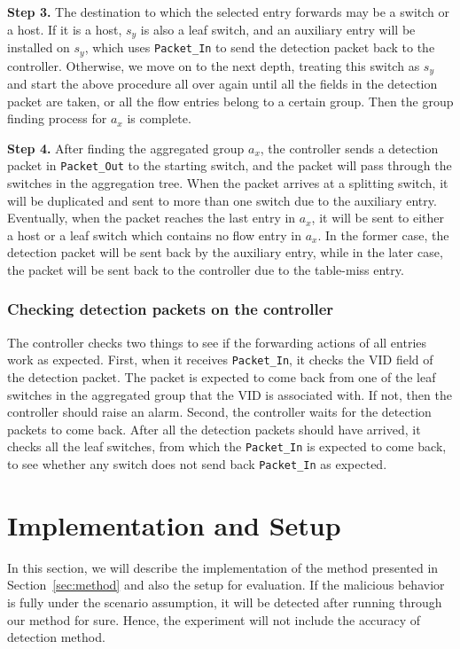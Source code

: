 \documentclass[conference]{IEEEtran}
\begin{document}
\textbf{Step 3.}
The destination to which the selected entry forwards may be a switch or a host. If it is a host, $s_y$ is also a leaf switch, and an auxiliary entry will be installed on $s_y$, which uses \texttt{Packet\_In} to send the detection packet back to the controller. Otherwise, we move on to the next depth, treating this switch as $s_y$ and start the above procedure all over again until all the fields in the detection packet are taken, or all the flow entries belong to a certain group. Then the group finding process for $a_x$ is complete.

\textbf{Step 4.}
After finding the aggregated group $a_x$, the controller sends a detection packet in \texttt{Packet\_Out} to the starting switch, and the packet will pass through the switches in the aggregation tree. When the packet arrives at a splitting switch, it will be duplicated and sent to more than one switch due to the auxiliary entry. Eventually, when the packet reaches the last entry in $a_x$, it will be sent to either a host or a leaf switch which contains no flow entry in $a_x$. In the former case, the detection packet will be sent back by the auxiliary entry, while in the later case, the packet will be sent back to the controller due to the table-miss entry.

\subsubsection{Checking detection packets on the controller}
The controller checks two things to see if the forwarding actions of all entries work as expected. First, when it receives \texttt{Packet\_In}, it checks the VID field of the detection packet. The packet is expected to come back from one of the leaf switches in the aggregated group that the VID is associated with. If not, then the controller should raise an alarm. Second, the controller waits for the detection packets to come back. After all the detection packets should have arrived, it checks all the leaf switches, from which the \texttt{Packet\_In} is expected to come back, to see whether any switch does not send back \texttt{Packet\_In} as expected. 

\section{Implementation and Setup}
\label{Implementation_and_Evaluation}
In this section, we will describe the implementation of the method presented in Section~\ref{sec:method} and also the setup for evaluation. If the malicious behavior is fully under the scenario assumption, it will be detected after running through our method for sure. Hence, the experiment will not include the accuracy of detection method.
\end{document}
